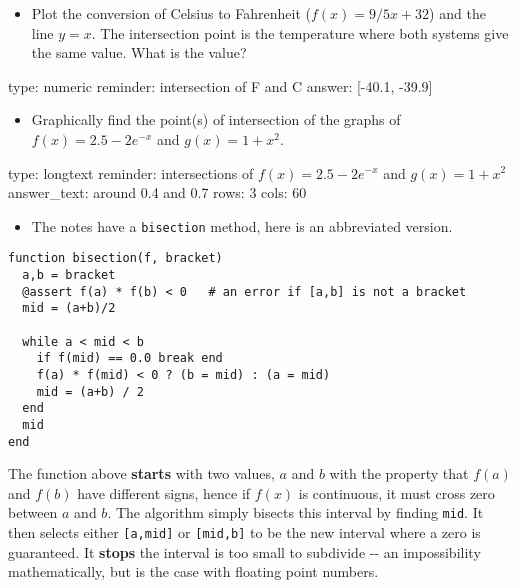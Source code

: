\documentclass[12pt]{article}
\begin{document}
\begin{itemize}
\itemsep1pt\parskip0pt
\item
  Plot the conversion of Celsius to Fahrenheit ($f(x) = 9/5x + 32$) and
  the line $y=x$. The intersection point is the temperature where both
  systems give the same value. What is the value?
\end{itemize}

\begin{answer}
    type: numeric
    reminder: intersection of F and C
    answer: [-40.1, -39.9]

\end{answer}

\begin{itemize}
\itemsep1pt\parskip0pt
\item
  Graphically find the point(s) of intersection of the graphs of
  $f(x) = 2.5-   2e^{-x}$ and $g(x) = 1 + x^2$.
\end{itemize}

\begin{answer}
type: longtext
reminder: intersections of \(f(x) = 2.5-2e^{-x}\) and \(g(x) = 1 + x^2\)
answer_text: around 0.4 and 0.7 
rows: 3
cols: 60
\end{answer}

\begin{itemize}
\itemsep1pt\parskip0pt
\item
  The notes have a \texttt{bisection} method, here is an abbreviated
  version.
\end{itemize}



\begin{verbatim}
function bisection(f, bracket)
  a,b = bracket  
  @assert f(a) * f(b) < 0   # an error if [a,b] is not a bracket
  mid = (a+b)/2

  while a < mid < b
    if f(mid) == 0.0 break end
    f(a) * f(mid) < 0 ? (b = mid) : (a = mid)  
    mid = (a+b) / 2
  end
  mid
end
\end{verbatim}
The function above \textbf{starts} with two values, $a$ and $b$ with the
property that $f(a)$ and $f(b)$ have different signs, hence if $f(x)$ is
continuous, it must cross zero between $a$ and $b$. The algorithm simply
bisects this interval by finding \texttt{mid}. It then selects either
\texttt{{[}a,mid{]}} or \texttt{{[}mid,b{]}} to be the new interval
where a zero is guaranteed. It \textbf{stops} the interval is too small
to subdivide -{}- an impossibility mathematically, but is the case with
floating point numbers.
\end{document}
